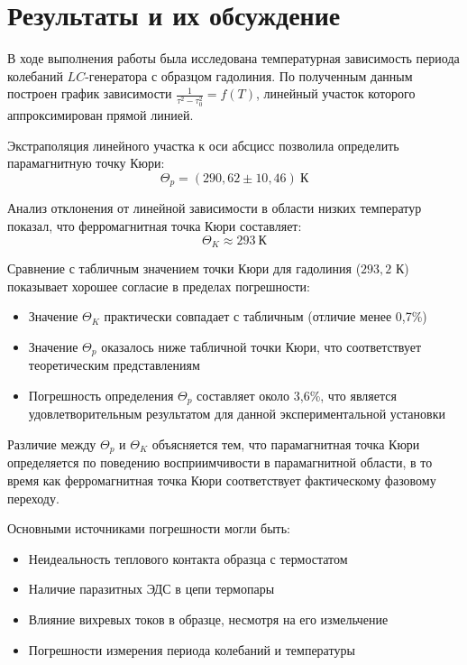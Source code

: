 \documentclass[a4paper]{article}
\begin{document}
\section*{Результаты и их обсуждение}

В ходе выполнения работы была исследована температурная зависимость периода колебаний $LC$-генератора с образцом гадолиния. По полученным данным построен график зависимости $\frac{1}{\tau^2 - \tau_0^2} = f(T)$, линейный участок которого аппроксимирован прямой линией.

Экстраполяция линейного участка к оси абсцисс позволила определить парамагнитную точку Кюри:
\[
\Theta_p = (290,\!62 \pm 10,\!46)\ \text{К}
\]

Анализ отклонения от линейной зависимости в области низких температур показал, что ферромагнитная точка Кюри составляет:
\[
\Theta_K \approx 293\ \text{К}
\]

Сравнение с табличным значением точки Кюри для гадолиния ($293,\!2$ К) показывает хорошее согласие в пределах погрешности:

\begin{itemize}
    \item Значение $\Theta_K$ практически совпадает с табличным (отличие менее 0,7\%)
    \item Значение $\Theta_p$ оказалось ниже табличной точки Кюри, что соответствует теоретическим представлениям
    \item Погрешность определения $\Theta_p$ составляет около 3,6\%, что является удовлетворительным результатом для данной экспериментальной установки
\end{itemize}

Различие между $\Theta_p$ и $\Theta_K$ объясняется тем, что парамагнитная точка Кюри определяется по поведению восприимчивости в парамагнитной области, в то время как ферромагнитная точка Кюри соответствует фактическому фазовому переходу.

Основными источниками погрешности могли быть:
\begin{itemize}
    \item Неидеальность теплового контакта образца с термостатом
    \item Наличие паразитных ЭДС в цепи термопары
    \item Влияние вихревых токов в образце, несмотря на его измельчение
    \item Погрешности измерения периода колебаний и температуры
\end{itemize}
\end{document}
